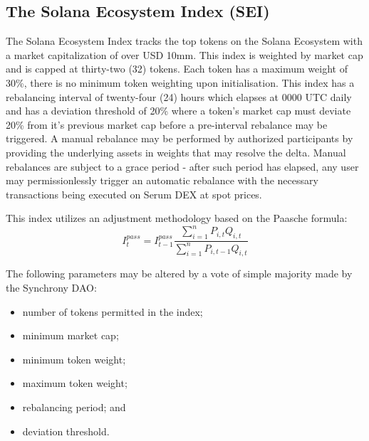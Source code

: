 \documentclass[10pt]{article}
\begin{document}
					\subsection{The Solana Ecosystem Index (SEI)}
					The Solana Ecosystem Index tracks the top tokens on the Solana Ecosystem with
					a market capitalization of over USD 10mm. This index is weighted by market cap
					and is capped at thirty-two (32) tokens. Each token has a maximum weight of
					30\%, there is no minimum token weighting upon initialisation. This index has
					a rebalancing interval of twenty-four (24) hours which elapses at 0000 UTC daily
					and has a deviation threshold of 20\% where a token's market cap must deviate
					20\% from it's previous market cap before a pre-interval rebalance may be
					triggered. A manual rebalance may be performed by authorized participants by providing the underlying assets in
					weights that may resolve the delta. Manual rebalances are subject to a grace
					period - after such period has elapsed, any user
					may permissionlessly trigger an automatic rebalance with the necessary
					transactions being executed on Serum DEX at spot
					prices.

					This index utilizes an adjustment methodology based on the Paasche formula:
					\[I^{pass}_t = I^{pass}_{t-1}\frac{\sum_{i=1}^n P_{i,t}Q_{i,t}}{\sum_{i=1}^n
					P_{i,t-1}Q_{i,t}}\]

					The following parameters may be altered by a vote of simple majority made by the
					Synchrony DAO:
					\begin{itemize}
						\item number of tokens permitted in the index;
						\item minimum market cap;
						\item minimum token weight;
						\item maximum token weight;
						\item rebalancing period; and
						\item deviation threshold.
					\end{itemize}
\end{document}
